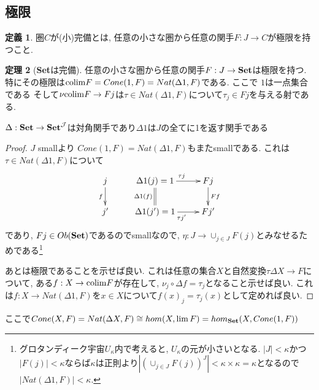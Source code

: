 \documentclass[dvipdfmx,a4paper,11pt]{article}
\newcommand{\colim}{{\rm colim}}
\theoremstyle{definition}
\newtheorem{thm}{定理}
\newtheorem{dfn}[thm]{定義}
\begin{document}
\subsection{極限}
 \begin{tcolorbox}
 [colback = white, colframe = green!35!black, fonttitle = \bfseries,breakable = true]
\begin{dfn}
圏$C$が(小)完備とは, 任意の小さな圏から任意の関手$F: J \to C$が極限を持つこと. 
\end{dfn}
\end{tcolorbox}

 \begin{tcolorbox}
 [colback = white, colframe = green!35!black, fonttitle = \bfseries,breakable = true]
\begin{thm}[{\bf Set}は完備]
\label{thm-set-complete}
任意の小さな圏から任意の関手$F: J \to {\bf Set}$は極限を持つ. 
特にその極限は$\colim F = Cone(1 , F)=Nat(\Delta 1, F)$である. ここで $1$は一点集合である
そして$\nu \colim  F \to F j$は$ \tau \in Nat(\Delta 1, F)$について$\tau_j \in Fj$を与える射である. 
\end{thm}
\end{tcolorbox}
$\Delta : {\bf Set}\to {\bf Set}^{\mathcal{J}}$は対角関手であり$\Delta 1$は$J$の全てに1を返す関手である

\begin{proof}
$J$ smallより
$Cone(1 , F)=Nat(\Delta 1, F)$もまたsmallである. 
これは$\tau \in Nat(\Delta 1, F)$について
\begin{equation*}
\xymatrix@C=25pt@R=20pt{
j\ar@{->}[d]_{f}&\Delta 1(j)=1\ar@{=}[d]_{\Delta 1(f)}  \ar@{->}[r]^{\tau j} & Fj\ar@{->}[d]^{Ff} \\
j'&\Delta 1(j')=1\ar@{->}[r]_{\tau j'} & Fj'\\   
}
\end{equation*}
であり, $Fj \in Ob({\bf Set })$であるのでsmallなので, $\eta : J \to \cup_{j \in J} F(j)$とみなせるためである\footnote{グロタンディーク宇宙$U_{\kappa}$内で考えると, $U_{\kappa}$の元が小さいとなる. $|J| < \kappa$かつ$|F(j)| < \kappa$ならば$\kappa$は正則より$|(\cup_{j \in J} F(j))^{J}| < \kappa \times \kappa = \kappa$となるので$|Nat(\Delta 1, F)|< \kappa$.}

あとは極限であることを示せば良い. これは任意の集合$X$と自然変換$ \tau  \Delta X \to F$について, 
ある$f : X \to \colim F $が存在して, $\nu_{j} \circ \Delta f  = \tau_j$となること示せば良い.
これは$ f : X \to Nat(\Delta 1, F)$を$x \in X$について$f(x)_j = \tau_{j}(x)$として定めれば良い. 
\end{proof}
ここで$Cone(X,F) = Nat(\Delta X , F) \cong hom(X, \lim F) = hom_{{\bf Set}} (X, Cone(1,F))$
\end{document}
